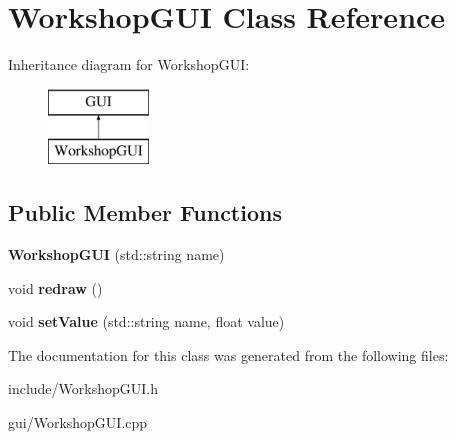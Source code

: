 \hypertarget{classWorkshopGUI}{\section{Workshop\-G\-U\-I Class Reference}
\label{classWorkshopGUI}
}
Inheritance diagram for Workshop\-G\-U\-I\-:\begin{figure}[H]
\begin{center}
\leavevmode
\includegraphics[height=2.000000cm]{classWorkshopGUI}
\end{center}
\end{figure}
\subsection*{Public Member Functions}
\begin{DoxyCompactItemize}
\item 
\hypertarget{classWorkshopGUI_af4b636b395eafa6ac762a6ad241a922f}{{\bfseries Workshop\-G\-U\-I} (std\-::string name)}\label{classWorkshopGUI_af4b636b395eafa6ac762a6ad241a922f}

\item 
\hypertarget{classWorkshopGUI_abaa68b1731ba8e97fcb73d10b948930b}{void {\bfseries redraw} ()}\label{classWorkshopGUI_abaa68b1731ba8e97fcb73d10b948930b}

\item 
\hypertarget{classWorkshopGUI_a8bd7d110ea4396da32970c59ec4c86e7}{void {\bfseries set\-Value} (std\-::string name, float value)}\label{classWorkshopGUI_a8bd7d110ea4396da32970c59ec4c86e7}

\end{DoxyCompactItemize}


The documentation for this class was generated from the following files\-:\begin{DoxyCompactItemize}
\item 
include/Workshop\-G\-U\-I.\-h\item 
gui/Workshop\-G\-U\-I.\-cpp\end{DoxyCompactItemize}
